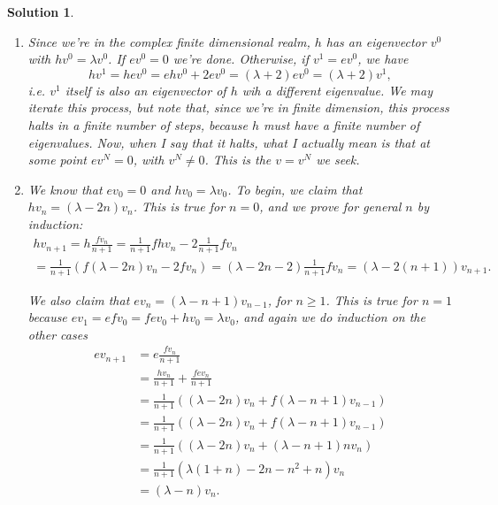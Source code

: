 \documentclass{article}
\theoremstyle{nonumberplain}
\newtheorem{sol}{Solution}
\begin{document}
\begin{sol}
\leavevmode
\begin{enumerate}
\item Since we're in the complex finite dimensional realm, $h$ has an eigenvector $v^0$ with $h v^0 = \lambda v^0$. If $e v^0 = 0$ we're done. Otherwise, if $v^1 = e v^0$, we have
\begin{equation}
h v^1 = h e v^0 = e h v^0 + 2 e v^0 = (\lambda + 2) e v^0 = (\lambda + 2) v^1,
\end{equation}
i.e. $v^1$ itself is also an eigenvector of $h$ wih a different eigenvalue. We may iterate this process, but note that, since we're in finite dimension, this process halts in a finite number of steps, because $h$ must have a finite number of eigenvalues. Now, when I say that it halts, what I actually mean is that at some point $e v^N = 0$, with $v^N \neq 0$. This is the $v = v^N$ we seek.

\item We know that $e v_0 = 0$ and $h v_0 = \lambda v_0$. To begin, we claim that $h v_n = (\lambda - 2n) v_n$. This is true for $n = 0$, and we prove for general $n$ by induction:
\begin{multline}
h v_{n+1} = h \frac{f v_n}{n+1} = \frac1{n+1} f h v_n - 2 \frac1{n+1} f v_n \\= \frac1{n+1} (f (\lambda-2n) v_n - 2 f v_n) = (\lambda - 2n - 2) \frac1{n+1} f v_n = (\lambda - 2(n+1)) v_{n+1}.
\end{multline}

We also claim that $e v_n = (\lambda - n + 1) v_{n-1}$, for $n \geq 1$. This is true for $n = 1$ because $e v_1 = e f v_0 = f e v_0 + h v_0 = \lambda v_0$, and again we do induction on the other cases
\begin{equation}
\begin{aligned}
e v_{n+1} &= e \frac{ f v_n }{n+1} \\
&= \frac{h v_n}{n+1} + \frac{f e v_n}{n+1} \\
&= \frac1{n+1} ( (\lambda - 2n) v_n + f (\lambda - n + 1) v_{n-1}) \\
&= \frac1{n+1} ( (\lambda - 2n) v_n + f (\lambda - n + 1) v_{n-1})\\
&= \frac1{n+1} ( (\lambda - 2n) v_n + (\lambda - n + 1) n v_n) \\
&= \frac1{n+1} ( \lambda (1+n) - 2n - n^2 + n) v_n \\
&= (\lambda - n) v_n.
\end{aligned}
\end{equation}


\end{enumerate}
\end{sol}
\end{document}
